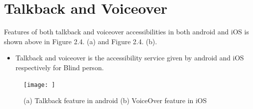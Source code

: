 \section{Talkback and Voiceover}
\noindent Features of both talkback and voiceover  accessibilities in both android and iOS is shown above in Figure 2.4. (a) and Figure 2.4. (b).\\
\begin{itemize}
     \item Talkback and voiceover is the accessibility service given by android and iOS respectively for Blind person.
\end{itemize}
\begin{figure}[h!]
	\centering
	\texttt{[image: ]}
	\caption{(a) Talkback feature in android (b) VoiceOver feature in iOS}
\end{figure}
